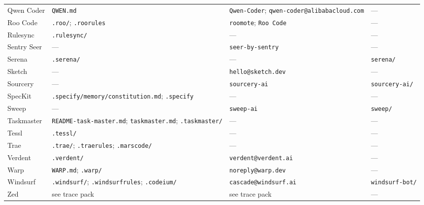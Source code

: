 \begin{small}
\begin{longtable}{@{}p{2.8cm}p{3.8cm}p{4.8cm}p{3.1cm}@{}}
Qwen Coder      & \texttt{QWEN.md}                              & \texttt{Qwen-Coder}; \texttt{qwen-coder@alibabacloud.com}                   & --- \\
Roo Code        & \texttt{.roo/}; \texttt{.roorules}            & \texttt{roomote}; \texttt{Roo Code}                                         & --- \\
Rulesync        & \texttt{.rulesync/}                           & ---                                                                         & --- \\
Sentry Seer     & ---                                           & \texttt{seer-by-sentry}                                                     & --- \\
Serena          & \texttt{.serena/}                             & ---                                                                         & \texttt{serena/} \\
Sketch          & ---                                           & \texttt{hello@sketch.dev}                                                   & --- \\
Sourcery        & ---                                           & \texttt{sourcery-ai}                                                        & \texttt{sourcery-ai/} \\
SpecKit         & \texttt{.specify/memory/constitution.md}; \texttt{.specify} & ---                                                       & --- \\
Sweep           & ---                                           & \texttt{sweep-ai}                                                           & \texttt{sweep/} \\
Taskmaster      & \texttt{README-task-master.md}; \texttt{taskmaster.md}; \texttt{.taskmaster/} & ---                                       & --- \\
Tessl           & \texttt{.tessl/}                              & ---                                                                         & --- \\
Trae            & \texttt{.trae/}; \texttt{.traerules}; \texttt{.marscode/} & ---                                                        & --- \\
Verdent         & \texttt{.verdent/}                            & \texttt{verdent@verdent.ai}                                                 & --- \\
Warp            & \texttt{WARP.md}; \texttt{.warp/}             & \texttt{noreply@warp.dev}                                                   & --- \\
Windsurf        & \texttt{.windsurf/}; \texttt{.windsurfrules}; \texttt{.codeium/} & \texttt{cascade@windsurf.ai}                           & \texttt{windsurf-bot/} \\
Zed             & see trace pack                                & see trace pack                                                              & --- \\

\end{longtable}
\end{small}
